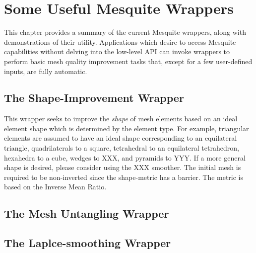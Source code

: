 \chapter{Some Useful Mesquite Wrappers}
\label{sec:useful_wrappers}

This chapter provides a summary of the current Mesquite wrappers, along
with demonstrations of their utility. Applications which desire to access
Mesquite capabilities without delving into the low-level API can invoke 
wrappers to perform basic mesh quality improvement tasks that, except for
a few user-defined inputs, are fully automatic. 

\section{The Shape-Improvement Wrapper} \label{sec:ShapeImprovementWrapper}
This wrapper seeks to improve the {\it shape} of mesh elements based on 
an ideal element shape which is determined by the element type. For example,
triangular elements are assumed to have an ideal shape corresponding to 
an equilateral triangle, quadrilaterals to a square, tetrahedral to an
equilateral tetrahedron, hexahedra to a cube, wedges to XXX, and pyramids 
to YYY. If a more general shape is desired, please consider using the XXX
smoother. The initial mesh is required to be non-inverted since the 
shape-metric has a barrier. The metric is based on the Inverse Mean Ratio.

\section{The Mesh Untangling Wrapper} \label{sec:MeshUntanglingWrapper}

\section{The Laplce-smoothing Wrapper} \label{sec:LaplaceSmoothingWrapper}

